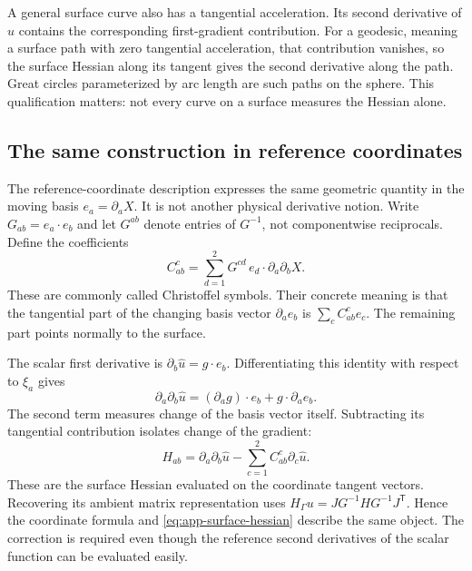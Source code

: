 A general surface curve also has a tangential acceleration. Its second
derivative of $u$ contains the corresponding first-gradient contribution.
For a geodesic, meaning a surface path with zero tangential acceleration,
that contribution vanishes, so the surface Hessian along its tangent gives
the second derivative along the path. Great circles parameterized by arc
length are such paths on the sphere. This qualification matters: not every
curve on a surface measures the Hessian alone.

\subsection{The same construction in reference coordinates}
The reference-coordinate description expresses the same geometric quantity
in the moving basis $e_a=\partial_aX$. It is not another physical derivative
notion. Write $G_{ab}=e_a\cdot e_b$ and let $G^{ab}$ denote entries of
$G^{-1}$, not componentwise reciprocals. Define the coefficients
\begin{equation}
 C^c_{ab}=\sum_{d=1}^2G^{cd}\,e_d\cdot\partial_a\partial_bX.
\end{equation}
These are commonly called Christoffel symbols. Their concrete meaning is
that the tangential part of the changing basis vector $\partial_a e_b$
is $\sum_c C^c_{ab}e_c$. The remaining part points normally to the surface.

The scalar first derivative is $\partial_b\widehat u=g\cdot e_b$.
Differentiating this identity with respect to $\xi_a$ gives
\begin{equation}
 \partial_a\partial_b\widehat u
   =(\partial_a g)\cdot e_b+g\cdot\partial_a e_b.
\end{equation}
The second term measures change of the basis vector itself. Subtracting
its tangential contribution isolates change of the gradient:
\begin{equation}
 H_{ab}=\partial_a\partial_b\widehat u
            -\sum_{c=1}^2 C^c_{ab}\partial_c\widehat u.
 \label{eq:app-coordinate-hessian}
\end{equation}
These are the surface Hessian evaluated on the coordinate tangent vectors.
Recovering its ambient matrix representation uses
$H_\Gamma u=J G^{-1}H G^{-1}J^{\mathsf T}$. Hence the coordinate formula
and \cref{eq:app-surface-hessian} describe the same object. The correction
is required even though the reference second derivatives of the scalar
function can be evaluated easily.

